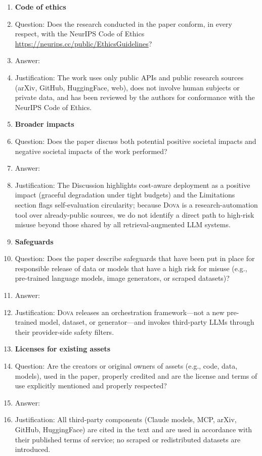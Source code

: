 \documentclass{article}
\theoremstyle{plain}
\theoremstyle{definition}
\newcommand{\dova}{\textsc{Dova}}
\begin{document}
\begin{enumerate}
\item {\bf Code of ethics}
    \item[] Question: Does the research conducted in the paper conform, in every respect, with the NeurIPS Code of Ethics \url{https://neurips.cc/public/EthicsGuidelines}?
    \item[] Answer: \answerYes{}
    \item[] Justification: The work uses only public APIs and public research sources (arXiv, GitHub, HuggingFace, web), does not involve human subjects or private data, and has been reviewed by the authors for conformance with the NeurIPS Code of Ethics.

\item {\bf Broader impacts}
    \item[] Question: Does the paper discuss both potential positive societal impacts and negative societal impacts of the work performed?
    \item[] Answer: \answerYes{}
    \item[] Justification: The Discussion highlights cost-aware deployment as a positive impact (graceful degradation under tight budgets) and the Limitations section flags self-evaluation circularity; because \dova{} is a research-automation tool over already-public sources, we do not identify a direct path to high-risk misuse beyond those shared by all retrieval-augmented LLM systems.

\item {\bf Safeguards}
    \item[] Question: Does the paper describe safeguards that have been put in place for responsible release of data or models that have a high risk for misuse (e.g., pre-trained language models, image generators, or scraped datasets)?
    \item[] Answer: \answerNA{}
    \item[] Justification: \dova{} releases an orchestration framework---not a new pre-trained model, dataset, or generator---and invokes third-party LLMs through their provider-side safety filters.

\item {\bf Licenses for existing assets}
    \item[] Question: Are the creators or original owners of assets (e.g., code, data, models), used in the paper, properly credited and are the license and terms of use explicitly mentioned and properly respected?
    \item[] Answer: \answerYes{}
    \item[] Justification: All third-party components (Claude models, MCP, arXiv, GitHub, HuggingFace) are cited in the text and are used in accordance with their published terms of service; no scraped or redistributed datasets are introduced.


\end{enumerate}
\end{document}
